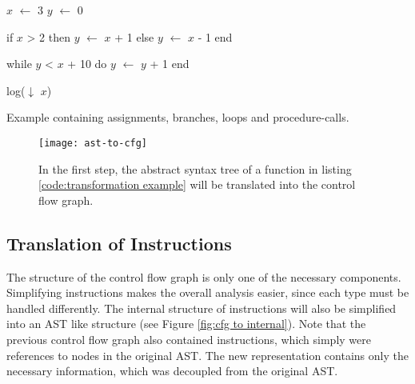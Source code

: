 \begin{program}
	\begin{GenericCode}
$x$ $\leftarrow$ 3
$y$ $\leftarrow$ 0
		
if $x$ > 2 then
	$y$ $\leftarrow$ $x$ + 1
else
	$y$ $\leftarrow$ $x$ - 1
end
		
while $y$ < $x$ + 10 do
	$y$ $\leftarrow$ $y$ + 1
end
		
log($\downarrow$ $x$)\end{GenericCode}
	\caption{Example containing assignments, branches, loops and procedure-calls. }
	\label{code:transformation example}
\end{program}

\begin{figure}
	\centering
	\texttt{[image: ast-to-cfg]}
	\caption{In the first step, the abstract syntax tree of a function in listing \ref{code:transformation example} will be translated into the control flow graph.}
	\label{fig:ast to cfg}
\end{figure}


\subsection{Translation of Instructions}
\label{subsec:translate instructions}
The structure of the control flow graph is only one of the necessary components. 
Simplifying instructions makes the overall analysis easier, since each type must be handled differently.
The internal structure of instructions will also be simplified into an AST like structure (see Figure \ref{fig:cfg to internal}). 
Note that the previous control flow graph also contained instructions, which simply were references to nodes in the original AST. 
The new representation contains only the necessary information, which was decoupled from the original AST.

